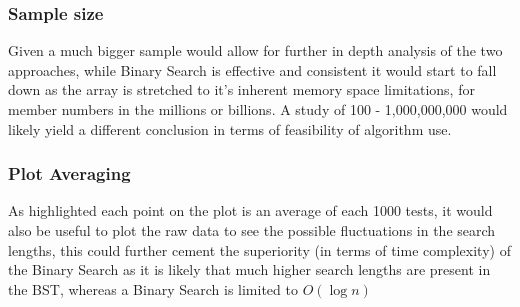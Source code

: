 \documentclass[pdftex,a4paper,10pt,titlepage]{article}
\begin{document}
\subsubsection{Sample size}
Given a much bigger sample would allow for further in depth analysis of the two approaches, while Binary Search is effective and consistent it would start to fall down as the array is stretched to it’s inherent memory space limitations, for member numbers in the millions or billions. A study of 100 - 1,000,000,000 would likely yield a different conclusion in terms of feasibility of algorithm use.

\subsubsection{Plot Averaging}
As highlighted each point on the plot is an average of each 1000 tests, it would also be useful to plot the raw data to see the possible fluctuations in the search lengths, this could further cement the superiority (in terms of time complexity) of the Binary Search as it is likely that much higher search lengths are present in the BST, whereas a Binary Search is limited to $O(\log{}n)$

\end{document}
